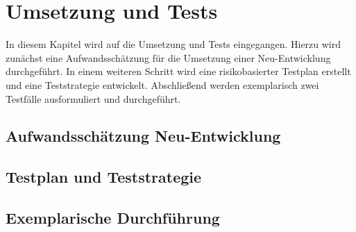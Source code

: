 \section{Umsetzung und Tests}
In diesem Kapitel wird auf die Umsetzung und Tests eingegangen.
Hierzu wird zunächst eine Aufwandsschätzung für die Umsetzung einer Neu-Entwicklung durchgeführt.
In einem weiteren Schritt wird eine risikobasierter Testplan erstellt und eine Teststrategie entwickelt.
Abschließend werden exemplarisch zwei Testfälle ausformuliert und durchgeführt.

\subsection{Aufwandsschätzung Neu-Entwicklung}

\subsection{Testplan und Teststrategie}

\subsection{Exemplarische Durchführung}
